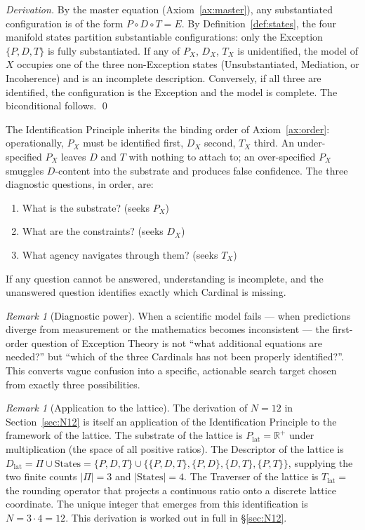 \documentclass[11pt,a4paper]{article}
\theoremstyle{definition}
\theoremstyle{remark}
\newtheorem{remark}[theorem]{Remark}
\newcommand{\R}{\mathbb{R}}
\begin{document}
\begin{proof}[Derivation]
By the master equation (Axiom~\ref{ax:master}), any substantiated configuration is of the form $P\circ D\circ T = E$. By Definition~\ref{def:states}, the four manifold states partition substantiable configurations: only the Exception $\{P,D,T\}$ is fully substantiated. If any of $P_{X}$, $D_{X}$, $T_{X}$ is unidentified, the model of $X$ occupies one of the three non-Exception states (Unsubstantiated, Mediation, or Incoherence) and is an incomplete description. Conversely, if all three are identified, the configuration is the Exception and the model is complete. The biconditional follows. \qed
\end{proof}

The Identification Principle inherits the binding order of Axiom~\ref{ax:order}: operationally, $P_{X}$ must be identified first, $D_{X}$ second, $T_{X}$ third. An under-specified $P_{X}$ leaves $D$ and $T$ with nothing to attach to; an over-specified $P_{X}$ smuggles $D$-content into the substrate and produces false confidence. The three diagnostic questions, in order, are:
\begin{enumerate}[leftmargin=*,label=(\roman*)]
\item What is the substrate? (seeks $P_{X}$)
\item What are the constraints? (seeks $D_{X}$)
\item What agency navigates through them? (seeks $T_{X}$)
\end{enumerate}
If any question cannot be answered, understanding is incomplete, and the unanswered question identifies exactly which Cardinal is missing.

\begin{remark}[Diagnostic power]
When a scientific model fails --- when predictions diverge from measurement or the mathematics becomes inconsistent --- the first-order question of Exception Theory is not ``what additional equations are needed?'' but ``which of the three Cardinals has not been properly identified?''. This converts vague confusion into a specific, actionable search target chosen from exactly three possibilities.
\end{remark}

\begin{remark}[Application to the lattice]\label{rem:id-lattice}
The derivation of $N=12$ in Section~\ref{sec:N12} is itself an application of the Identification Principle to the framework of the lattice. The substrate of the lattice is $P_{\mathrm{lat}} = \R^{+}$ under multiplication (the space of all positive ratios). The Descriptor of the lattice is $D_{\mathrm{lat}} = \Pi \cup \mathrm{States} = \{P,D,T\} \cup \{\{P,D,T\},\{P,D\},\{D,T\},\{P,T\}\}$, supplying the two finite counts $|\Pi|=3$ and $|\mathrm{States}|=4$. The Traverser of the lattice is $T_{\mathrm{lat}} = $ the rounding operator that projects a continuous ratio onto a discrete lattice coordinate. The unique integer that emerges from this identification is $N = 3\cdot 4 = 12$. This derivation is worked out in full in \S\ref{sec:N12}.
\end{remark}
\end{document}
